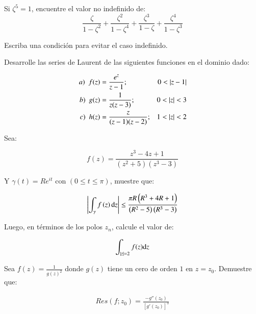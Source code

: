 \begin{Tema}
    Si $\zeta^5 = 1$, encuentre el valor no indefinido de:
    \begin{equation*}
        \frac{\zeta}{1-\zeta^2}+\frac{\zeta^2}{1-\zeta^4}+\frac{\zeta^3}{1-\zeta}+\frac{\zeta^4}{1-\zeta^3}
    \end{equation*}

    Escriba una condición para evitar el caso indefinido.
\end{Tema}



    


\begin{Tema}
    Desarrolle las series de Laurent de las siguientes funciones en el dominio dado:

    \begin{align*}
        a)~~f(z)&=\frac{e^z}{z-1};&0    <\abs{z-1}\\
        b)~~g(z)&=\frac{1}{z(z-3)};&0<\abs{z}<3\\
        c)~~h(z)&=\frac{z}{(z-1)(z-2)};&1<\abs{z}<2
    \end{align*}
\end{Tema}


\begin{Tema}
    Sea:

    \begin{equation*}
        f(z) = \frac{z^{3}-4z+1}{\left(z^2+5\right)\left(z^3-3\right)}
    \end{equation*}

    Y $\gamma(t)=Re^{it}$ con $\left(0\leq t \leq \pi\right)$, muestre que:

    \begin{align*}
        \abs{\int_\gamma f\left(z\right)\dd z}\leq \frac{\pi R\left(R^3+4R+1\right)}{\left(R^2-5\right)\left(R^3-3\right)}
    \end{align*}

    Luego, en términos de los polos $z_n$, calcule el valor de:

    \begin{equation*}
        \int_{\abs{z}=2} f(z)\dd z
    \end{equation*}

\end{Tema}

\begin{Tema}
    Sea $f(z)=\frac{1}{g(z)^2}$ donde $g(z)$ tiene un cero de orden $1$ en $z=z_0$. Demuestre que:

    \begin{align*}
        Res(f;z_0) = \frac{-g''(z_0)}{\left[g'(z_0)\right]^3}
    \end{align*}
\end{Tema}


